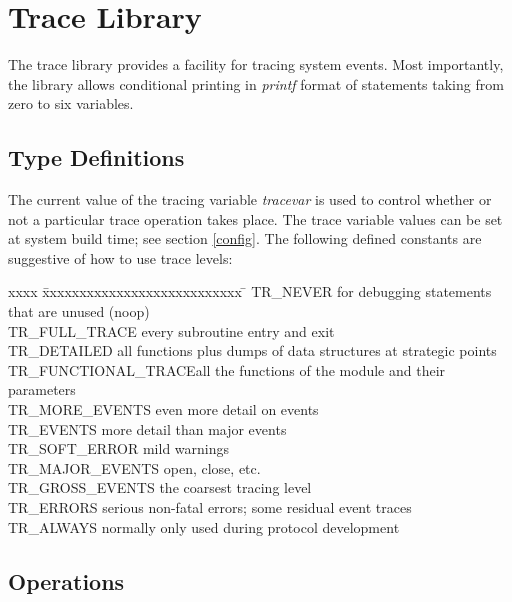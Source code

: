 % 
%
%

\section{Trace Library}\label{kdebug}

The trace library provides a facility for tracing system events.  Most
importantly, the library allows conditional printing in {\em printf}
format of statements taking from zero to six variables.

\subsection{Type Definitions}

The current value of the tracing variable {\em tracevar} is used to
control whether or not a particular trace operation takes place.  The
trace variable values can be set at system build time; see section
\ref{config}. The following defined constants are suggestive of how to 
use trace levels:

\begin{tabbing}
xxxx \= xxxxxxxxxxxxxxxxxxxxxxxxxxx \= \kill
\>TR\_NEVER \>          for debugging statements that are unused (noop)\\
\>TR\_FULL\_TRACE\>     every subroutine entry and exit\\
\>TR\_DETAILED\>        all functions plus dumps of data structures at strategic points\\
\>TR\_FUNCTIONAL\_TRACE\>all the functions of the module and their parameters\\
\>TR\_MORE\_EVENTS\>    even more detail on events\\
\>TR\_EVENTS\>          more detail than major events\\
\>TR\_SOFT\_ERROR\>     mild warnings\\
\>TR\_MAJOR\_EVENTS\>   open, close, etc.\\
\>TR\_GROSS\_EVENTS\>   the coarsest tracing level\\
\>TR\_ERRORS\>          serious non-fatal errors; some residual event traces\\
\>TR\_ALWAYS\>          normally only used during protocol development
\end{tabbing}

\subsection{Operations}

